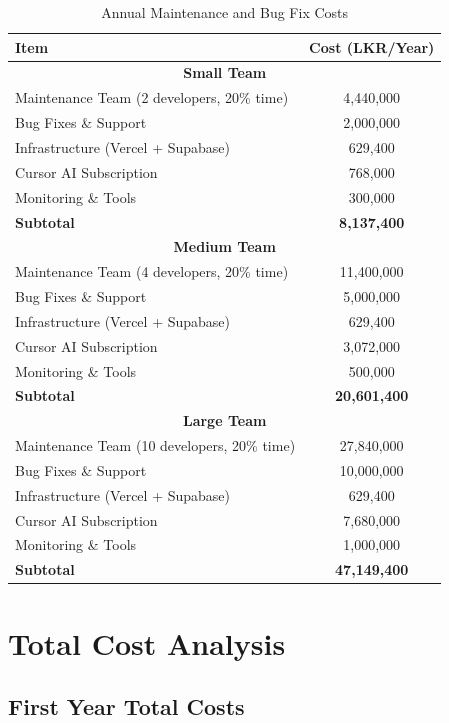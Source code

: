 \documentclass[12pt,a4paper]{article}
\begin{document}
\begin{table}[H]
\centering
\begin{tabular}{|l|c|}
\hline
\textbf{Item} & \textbf{Cost (LKR/Year)} \\
\hline
\multicolumn{2}{|c|}{\textbf{Small Team}} \\
\hline
Maintenance Team (2 developers, 20\% time) & 4,440,000 \\
Bug Fixes \& Support & 2,000,000 \\
Infrastructure (Vercel + Supabase) & 629,400 \\
Cursor AI Subscription & 768,000 \\
Monitoring \& Tools & 300,000 \\
\hline
\textbf{Subtotal} & \textbf{8,137,400} \\
\hline
\multicolumn{2}{|c|}{\textbf{Medium Team}} \\
\hline
Maintenance Team (4 developers, 20\% time) & 11,400,000 \\
Bug Fixes \& Support & 5,000,000 \\
Infrastructure (Vercel + Supabase) & 629,400 \\
Cursor AI Subscription & 3,072,000 \\
Monitoring \& Tools & 500,000 \\
\hline
\textbf{Subtotal} & \textbf{20,601,400} \\
\hline
\multicolumn{2}{|c|}{\textbf{Large Team}} \\
\hline
Maintenance Team (10 developers, 20\% time) & 27,840,000 \\
Bug Fixes \& Support & 10,000,000 \\
Infrastructure (Vercel + Supabase) & 629,400 \\
Cursor AI Subscription & 7,680,000 \\
Monitoring \& Tools & 1,000,000 \\
\hline
\textbf{Subtotal} & \textbf{47,149,400} \\
\hline
\end{tabular}
\caption{Annual Maintenance and Bug Fix Costs}
\end{table}

\section{Total Cost Analysis}

\subsection{First Year Total Costs}
\end{document}
